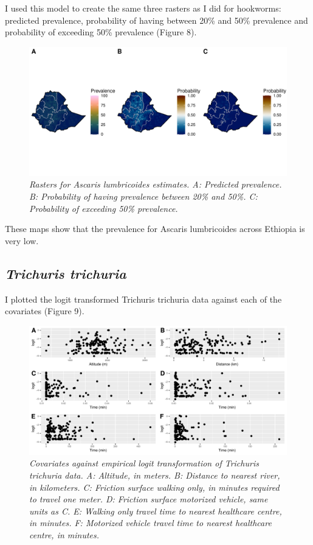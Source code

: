 \documentclass[
]{article}
\begin{document}
I used this model to create the same three rasters as I did for
hookworms: predicted prevalence, probability of having between 20\% and
50\% prevalence and probability of exceeding 50\% prevalence (Figure 8).

\begin{figure}
\centering
\includegraphics{write_up_files/figure-latex/Asc.prediction.rasters-1.pdf}
\caption{\emph{Rasters for Ascaris lumbricoides estimates. A: Predicted
prevalence. B: Probability of having prevalence between 20\% and 50\%.
C: Probability of exceeding 50\% prevalence.}}
\end{figure}

These maps show that the prevalence for Ascaris lumbricoides across
Ethiopia is very low.

\newpage

\hypertarget{trichuris-trichuria}{%
\subsection{\texorpdfstring{\emph{Trichuris
trichuria}}{Trichuris trichuria}}\label{trichuris-trichuria}}

I plotted the logit transformed Trichuris trichuria data against each of
the covariates (Figure 9).

\begin{figure}
\centering
\includegraphics{write_up_files/figure-latex/TT_e.logit-1.pdf}
\caption{\textit{Covariates against empirical logit transformation of Trichuris trichuria data. A: Altitude, in meters. B: Distance to nearest river, in kilometers. C: Friction surface walking only, in minutes required to travel one meter. D: Friction surface motorized vehicle, same units as C. E: Walking only travel time to nearest healthcare centre, in minutes. F: Motorized vehicle travel time to nearest healthcare centre, in minutes.}}
\end{figure}
\end{document}
